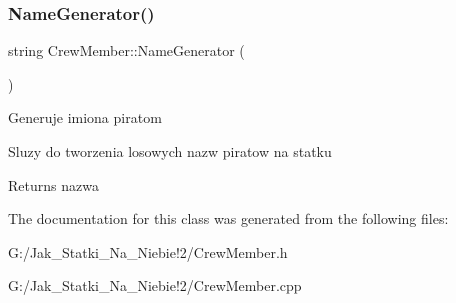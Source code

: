 \subsubsection{\texorpdfstring{Name\+Generator()}{NameGenerator()}}
{\footnotesize\ttfamily string Crew\+Member\+::\+Name\+Generator (\begin{DoxyParamCaption}{ }\end{DoxyParamCaption})}

Generuje imiona piratom

Sluzy do tworzenia losowych nazw piratow na statku \begin{DoxyReturn}{Returns}
nazwa 
\end{DoxyReturn}


The documentation for this class was generated from the following files\+:\begin{DoxyCompactItemize}
\item 
G\+:/\+Jak\+\_\+\+Statki\+\_\+\+Na\+\_\+\+Niebie!2/Crew\+Member.\+h\item 
G\+:/\+Jak\+\_\+\+Statki\+\_\+\+Na\+\_\+\+Niebie!2/Crew\+Member.\+cpp\end{DoxyCompactItemize}
